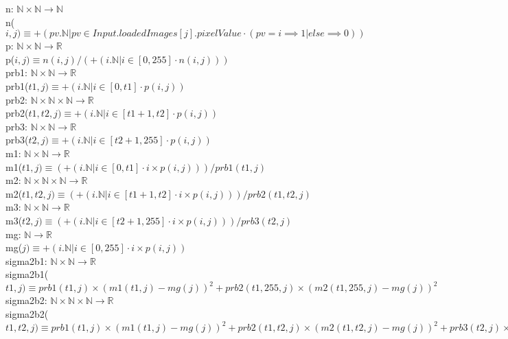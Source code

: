 \documentclass[12pt, titlepage]{article}
\begin{document}
n: $\mathbb{N} \times \mathbb{N} \rightarrow \mathbb{N}$\\
n($i,j) \equiv +(pv.\mathbb{N} |pv \in Input.loadedImages[j].pixelValue \cdot
(pv = i \implies 1 | else \implies 0))$\\
p: $\mathbb{N} \times \mathbb{N} \rightarrow \mathbb{R}$\\
p($i,j) \equiv n(i,j)/(+(i.\mathbb{N} | i \in [0,255] \cdot n(i,j)))$\\
prb1: $\mathbb{N} \times \mathbb{N} \rightarrow \mathbb{R}$\\
prb1($t1,j) \equiv +(i.\mathbb{N} | i \in [0,t1] \cdot p(i,j))$\\
prb2: $\mathbb{N} \times \mathbb{N} \times \mathbb{N} \rightarrow \mathbb{R}$\\
prb2($t1,t2,j) \equiv +(i.\mathbb{N} | i \in [t1+1,t2] \cdot p(i,j))$\\
prb3: $\mathbb{N} \times \mathbb{N} \rightarrow \mathbb{R}$\\
prb3($t2,j) \equiv +(i.\mathbb{N} | i \in [t2+1,255] \cdot p(i,j))$\\
m1: $\mathbb{N} \times \mathbb{N} \rightarrow \mathbb{R}$\\
m1($t1,j) \equiv (+(i.\mathbb{N} | i \in [0,t1] \cdot i \times
p(i,j)))/prb1(t1,j)$\\
m2: $\mathbb{N} \times \mathbb{N} \times \mathbb{N} \rightarrow \mathbb{R}$\\
m2($t1,t2,j) \equiv (+(i.\mathbb{N} | i \in [t1+1,t2] \cdot i \times
p(i,j)))/prb2(t1,t2,j)$\\
m3: $\mathbb{N} \times \mathbb{N} \rightarrow \mathbb{R}$\\
m3($t2,j) \equiv (+(i.\mathbb{N} | i \in [t2+1,255] \cdot i \times
p(i,j)))/prb3(t2,j)$\\
mg: $\mathbb{N} \rightarrow \mathbb{R}$\\
mg($j) \equiv +(i.\mathbb{N} | i \in [0,255] \cdot i \times p(i,j))$\\
sigma2b1: $\mathbb{N} \times \mathbb{N} \rightarrow \mathbb{R}$\\
sigma2b1($t1,j) \equiv prb1(t1,j) \times (m1(t1,j)-mg(j))^2 + prb2(t1,255,j)
\times (m2(t1,255,j)-mg(j))^2$\\
sigma2b2: $\mathbb{N} \times \mathbb{N} \times \mathbb{N} \rightarrow
\mathbb{R}$\\
sigma2b2($t1,t2,j) \equiv prb1(t1,j) \times (m1(t1,j)-mg(j))^2 + prb2(t1,t2,j)
\times (m2(t1,t2,j)-mg(j))^2 + prb3(t2,j) \times (m3(t2,j)-mg(j))^2$\\
\end{document}
